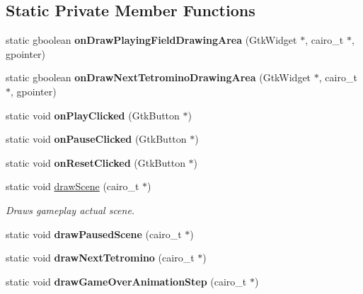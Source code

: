 \subsection*{Static Private Member Functions}
\begin{DoxyCompactItemize}
\item 
\mbox{\label{classTetreesUI_a829fc73fdc1f45fb567168f2c37ab012}} 
static gboolean {\bfseries on\+Draw\+Playing\+Field\+Drawing\+Area} (Gtk\+Widget $\ast$, cairo\+\_\+t $\ast$, gpointer)
\item 
\mbox{\label{classTetreesUI_aa775d6f3e3ca5c11ec3bb73e8dd7f62d}} 
static gboolean {\bfseries on\+Draw\+Next\+Tetromino\+Drawing\+Area} (Gtk\+Widget $\ast$, cairo\+\_\+t $\ast$, gpointer)
\item 
\mbox{\label{classTetreesUI_a9d2b1a8025a16aac4097850deedadd18}} 
static void {\bfseries on\+Play\+Clicked} (Gtk\+Button $\ast$)
\item 
\mbox{\label{classTetreesUI_afe0ff659354e4c6dfe6a7f2fce3ad0de}} 
static void {\bfseries on\+Pause\+Clicked} (Gtk\+Button $\ast$)
\item 
\mbox{\label{classTetreesUI_af80a44c26a4ce356e1f999c8a341197c}} 
static void {\bfseries on\+Reset\+Clicked} (Gtk\+Button $\ast$)
\item 
static void \hyperlink{classTetreesUI_a357ae7240cc5f35b5d61244e7a6bcfe3}{draw\+Scene} (cairo\+\_\+t $\ast$)
\begin{DoxyCompactList}\small\item\em Draws gameplay actual scene. \end{DoxyCompactList}\item 
\mbox{\label{classTetreesUI_a7d39f8caa75f5e755e3cebb0e05bb779}} 
static void {\bfseries draw\+Paused\+Scene} (cairo\+\_\+t $\ast$)
\item 
\mbox{\label{classTetreesUI_a9f4fa68c99e9d6146d9bdf2baa9db4d6}} 
static void {\bfseries draw\+Next\+Tetromino} (cairo\+\_\+t $\ast$)
\item 
\mbox{\label{classTetreesUI_a4d16e60b9a27bfbc2aac1deba09cc74c}} 
static void {\bfseries draw\+Game\+Over\+Animation\+Step} (cairo\+\_\+t $\ast$)

\end{DoxyCompactItemize}
